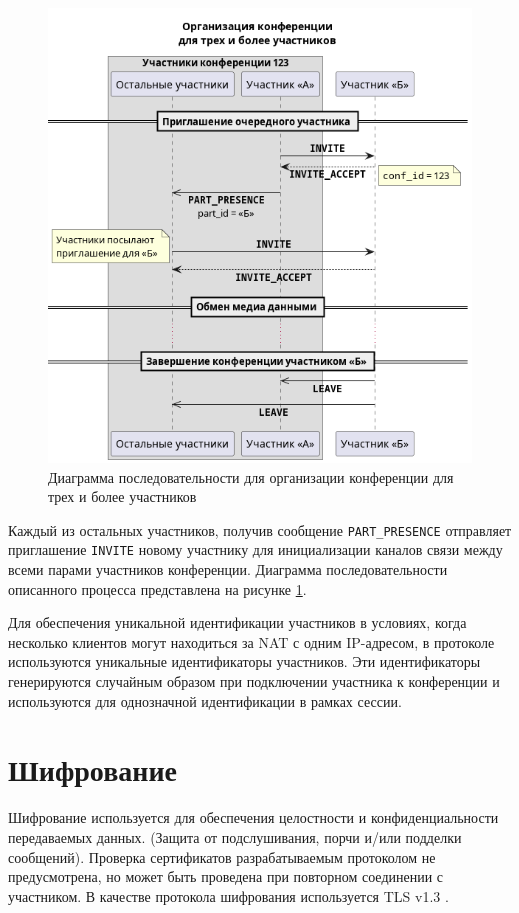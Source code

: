 \begin{figure}[H]
  \centering
  \includegraphics[width=0.9\linewidth]{inc/diag/seq-3/conf-3.png}
  \caption{Диаграмма последовательности для организации конференции для трех и более участников}
  \label{img:conf-3}
\end{figure}

Каждый из остальных участников, получив сообщение \texttt{PART\_PRESENCE} отправляет приглашение \texttt{INVITE} новому участнику для инициализации каналов связи между всеми парами участников конференции.
Диаграмма последовательности описанного процесса представлена на рисунке \ref{img:conf-3}.

Для обеспечения уникальной идентификации участников в условиях, когда несколько клиентов могут находиться за NAT с одним IP-адресом, в протоколе используются уникальные идентификаторы участников.
Эти идентификаторы генерируются случайным образом при подключении участника к конференции и используются для однозначной идентификации в рамках сессии.

\section{Шифрование}

Шифрование используется для обеспечения целостности и конфиденциальности передаваемых данных. (Защита от подслушивания, порчи и/или подделки сообщений).
Проверка сертификатов разрабатываемым протоколом не предусмотрена, но может быть проведена при повторном соединении с участником.
В качестве протокола шифрования используется TLS v1.3 \cite{tls}.


